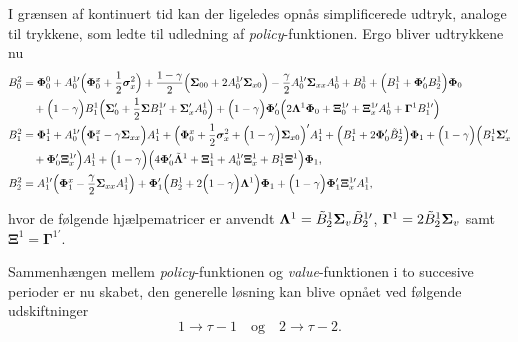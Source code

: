 \documentclass[
  a4paper,
  oneside]{memoir}
\begin{document}
I grænsen af kontinuert tid kan der ligeledes opnås simplificerede udtryk, analoge til trykkene, som ledte til udledning af \emph{policy}-funktionen. Ergo bliver udtrykkene nu
\begin{align*}
B_0^2&=\bm{\Phi}_0^0 + A_0^{1\prime} \Big(\bm{\Phi}_0^x + \frac{1}{2}\bm{\sigma}_x^2\Big) + \frac{1-\gamma}{2} \Big(\bm{\Sigma}_{00}+ 2A_0^{1\prime} \bm{\Sigma}_{x0}\Big) - \frac{\gamma}{2} A_0^{1\prime} \bm{\Sigma}_{xx} A_0^1 + B_0^1 + \Big(B_1^1 + \bm{\Phi}_0' B_2^1\Big) \bm{\Phi }_0\\
&\quad + \Big(1-\gamma\Big)B_1^1 \Big(\bm{\Sigma}_0' + \frac{1}{2} \bm{\Sigma} B_1^{1\prime} + \bm{\Sigma}_x' A_0^1\Big) + \Big(1-\gamma\Big) \bm{\Phi}_0' \Big(2\bm{\Lambda}^1 \bm{\Phi}_0 + \bm{\Xi}_0^{1\prime} + \bm{\Xi}_x^{1\prime} A_0^1 + \bm{\Gamma}^1 B_1^{1\prime}\Big)\\
B_1^2&=\bm{\Phi}_1^1 + A_0^{1\prime} \Big(\bm{\Phi}_1^x -\gamma\bm{\Sigma}_{xx}\Big) A_1^1 + \Big(\bm{\Phi}_0^x + \frac{1}{2}\bm{\sigma}_x^2 + \Big(1-\gamma\Big) \bm{\Sigma}_{x0}\Big)' A_1^1 + \Big(B_1^1 + 2\bm{\Phi}_0' \Tilde{B}_2^1\Big)\bm{\Phi}_1 + \Big(1-\gamma\Big) \Big(B_1^1\bm{\Sigma}_x'\\
&\quad + \bm{\Phi}_0' \bm{\Xi}_{x}^{1\prime}\Big) A_1^1 + \Big(1-\gamma\Big) \Big(4 \bm{\Phi}_0' \Tilde{\bm{\Lambda}}^1 + \bm{\Xi}_1^1 + A_0^{1\prime} \bm{\Xi}_x^1 + B_1^1 \bm{\Xi}^1\Big)\bm{\Phi}_1,\\
B_2^2&= A_1^{1\prime} \Big(\bm{\Phi}_1^x - \frac{\gamma}{2} \bm{\Sigma}_{xx} A_1^1\Big) + \bm{\Phi}_1' \Big(B_2^1 + 2\Big(1-\gamma\Big) \bm{\Lambda}^1\Big) \bm{\Phi}_1 + \Big(1-\gamma\Big) \bm{\Phi}_1' \bm{\Xi}_x^{1\prime} A_1^1,
\end{align*}

hvor de følgende hjælpematricer er anvendt \(\bm{\Lambda}^1=\Tilde{B}_2^{1}\bm{\Sigma}_v \Tilde{B}_2^{1\prime}\), \(\bm{\Gamma}^1=2\Tilde{B}_2^{1}\bm{\Sigma}_v\) samt \(\bm{\Xi}^1=\bm{\Gamma}^{1\prime}\).

Sammenhængen mellem \emph{policy}-funktionen og \emph{value}-funktionen i to succesive perioder er nu skabet, den generelle løsning kan blive opnået ved følgende udskiftninger
\begin{equation*}
1\to \tau-1\quad\text{og}\quad 2\to \tau-2.
\end{equation*}

\nocite{*}

  
\end{document}
